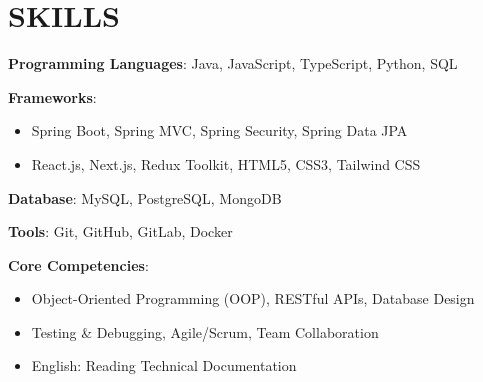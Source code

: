 \section{SKILLS}
\resumeSubHeadingListStart

  \item
    \resumeItemListStart
      \item \textbf{Programming Languages}: Java, JavaScript, TypeScript, Python, SQL
      \item \textbf{Frameworks}:
        \begin{itemize}
          \item Spring Boot, Spring MVC, Spring Security, Spring Data JPA
          \item React.js, Next.js, Redux Toolkit, HTML5, CSS3, Tailwind CSS
        \end{itemize}
      \item \textbf{Database}: MySQL, PostgreSQL, MongoDB
      \item \textbf{Tools}: Git, GitHub, GitLab, Docker
      \item \textbf{Core Competencies}:
        \begin{itemize}
          \item Object-Oriented Programming (OOP), RESTful APIs, Database Design
          \item Testing \& Debugging, Agile/Scrum, Team Collaboration
          \item English: Reading Technical Documentation
        \end{itemize}
    \resumeItemListEnd

\resumeSubHeadingListEnd
